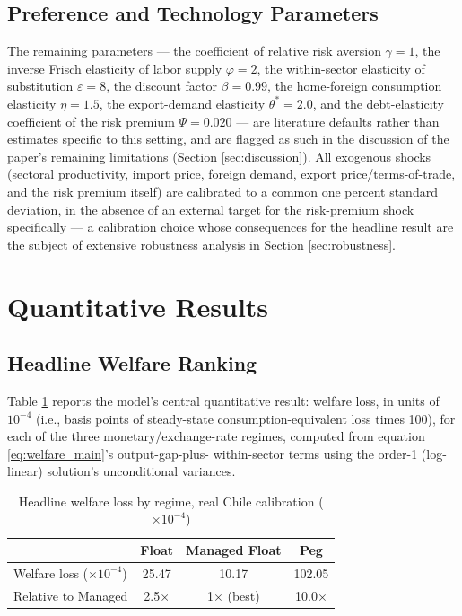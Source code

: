 \documentclass[12pt]{article}
\begin{document}
\subsection{Preference and Technology Parameters}

The remaining parameters --- the coefficient of relative risk aversion $\gamma=1$, the inverse Frisch
elasticity of labor supply $\varphi=2$, the within-sector elasticity of substitution
$\varepsilon=8$, the discount factor $\beta=0.99$, the home-foreign consumption elasticity
$\eta=1.5$, the export-demand elasticity $\theta^*=2.0$, and the debt-elasticity coefficient of the
risk premium $\Psi=0.020$ --- are literature defaults rather than estimates specific to this setting,
and are flagged as such in the discussion of the paper's remaining limitations (Section
\ref{sec:discussion}). All exogenous shocks (sectoral productivity, import price, foreign demand,
export price/terms-of-trade, and the risk premium itself) are calibrated to a common one percent
standard deviation, in the absence of an external target for the risk-premium shock specifically ---
a calibration choice whose consequences for the headline result are the subject of extensive
robustness analysis in Section \ref{sec:robustness}.

\section{Quantitative Results}
\label{sec:results}

\subsection{Headline Welfare Ranking}

Table \ref{tab:headline} reports the model's central quantitative result: welfare loss, in units of
$10^{-4}$ (i.e., basis points of steady-state consumption-equivalent loss times 100), for each of the
three monetary/exchange-rate regimes, computed from equation \eqref{eq:welfare_main}'s output-gap-plus-
within-sector terms using the order-1 (log-linear) solution's unconditional variances.

\begin{table}[H]
\centering
\caption{Headline welfare loss by regime, real Chile calibration ($\times10^{-4}$)}
\label{tab:headline}
\begin{tabular}{lccc}
\toprule
 & Float & Managed Float & Peg \\
\midrule
Welfare loss ($\times10^{-4}$) & 25.47 & 10.17 & 102.05 \\
Relative to Managed & 2.5$\times$ & 1$\times$ (best) & 10.0$\times$ \\
\bottomrule
\end{tabular}
\end{table}
\end{document}
